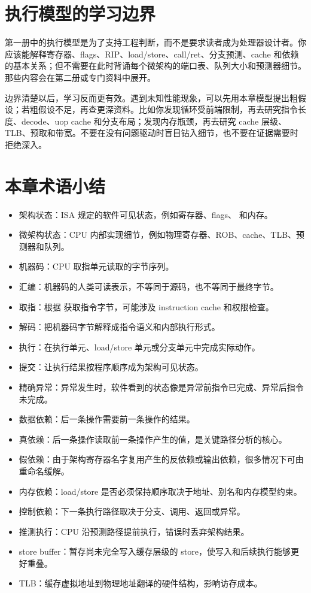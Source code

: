 \section{执行模型的学习边界}

第一册中的执行模型是为了支持工程判断，而不是要求读者成为处理器设计者。你应该能解释寄存器、flags、RIP、load/store、call/ret、分支预测、cache 和依赖的基本关系；但不需要在此时背诵每个微架构的端口表、队列大小和预测器细节。那些内容会在第二册或专门资料中展开。

边界清楚以后，学习反而更有效。遇到未知性能现象，可以先用本章模型提出粗假设；若粗假设不足，再查更深资料。比如你发现循环受前端限制，再去研究指令长度、decode、uop cache 和分支布局；发现内存瓶颈，再去研究 cache 层级、TLB、预取和带宽。不要在没有问题驱动时盲目钻入细节，也不要在证据需要时拒绝深入。

\section{本章术语小结}

\begin{itemize}
  \item 架构状态：ISA 规定的软件可见状态，例如寄存器、flags、 和内存。
  \item 微架构状态：CPU 内部实现细节，例如物理寄存器、ROB、cache、TLB、预测器和队列。
  \item 机器码：CPU 取指单元读取的字节序列。
  \item 汇编：机器码的人类可读表示，不等同于源码，也不等同于最终字节。
  \item 取指：根据  获取指令字节，可能涉及 instruction cache 和权限检查。
  \item 解码：把机器码字节解释成指令语义和内部执行形式。
  \item 执行：在执行单元、load/store 单元或分支单元中完成实际动作。
  \item 提交：让执行结果按程序顺序成为架构可见状态。
  \item 精确异常：异常发生时，软件看到的状态像是异常前指令已完成、异常后指令未完成。
  \item 数据依赖：后一条操作需要前一条操作的结果。
  \item 真依赖：后一条操作读取前一条操作产生的值，是关键路径分析的核心。
  \item 假依赖：由于架构寄存器名字复用产生的反依赖或输出依赖，很多情况下可由重命名缓解。
  \item 内存依赖：load/store 是否必须保持顺序取决于地址、别名和内存模型约束。
  \item 控制依赖：下一条执行路径取决于分支、调用、返回或异常。
  \item 推测执行：CPU 沿预测路径提前执行，错误时丢弃架构结果。
  \item store buffer：暂存尚未完全写入缓存层级的 store，使写入和后续执行能够更好重叠。
  \item TLB：缓存虚拟地址到物理地址翻译的硬件结构，影响访存成本。
\end{itemize}


